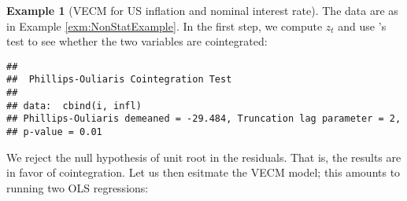 \documentclass[
  12pt,
]{book}
\newenvironment{Shaded}{\begin{snugshade}}{\end{snugshade}}
\newcommand{\DecValTok}[1]{\textcolor[rgb]{0.00,0.00,0.81}{#1}}
\newcommand{\FunctionTok}[1]{\textcolor[rgb]{0.00,0.00,0.00}{#1}}
\newcommand{\NormalTok}[1]{#1}
\newcommand{\OtherTok}[1]{\textcolor[rgb]{0.56,0.35,0.01}{#1}}
\newcommand{\SpecialCharTok}[1]{\textcolor[rgb]{0.00,0.00,0.00}{#1}}
\theoremstyle{definition}
\theoremstyle{definition}
\newtheorem{example}{Example}[chapter]
\theoremstyle{definition}
\theoremstyle{definition}
\theoremstyle{remark}
\begin{document}
\begin{example}[VECM for US inflation and nominal interest rate]
\protect\hypertarget{exm:VECMUS}{}\label{exm:VECMUS}The data are as in Example \ref{exm:NonStatExample}. In the first step, we compute \(z_t\) and use \citet{Phillips_Ouliaris_1990}'s test to see whether the two variables are cointegrated:

\begin{Shaded}
\end{Shaded}

\begin{verbatim}
## 
##  Phillips-Ouliaris Cointegration Test
## 
## data:  cbind(i, infl)
## Phillips-Ouliaris demeaned = -29.484, Truncation lag parameter = 2,
## p-value = 0.01
\end{verbatim}

We reject the null hypothesis of unit root in the residuals. That is, the results are in favor of cointegration. Let us then esitmate the VECM model; this amounts to running two OLS regressions:


\end{example}
\end{document}
